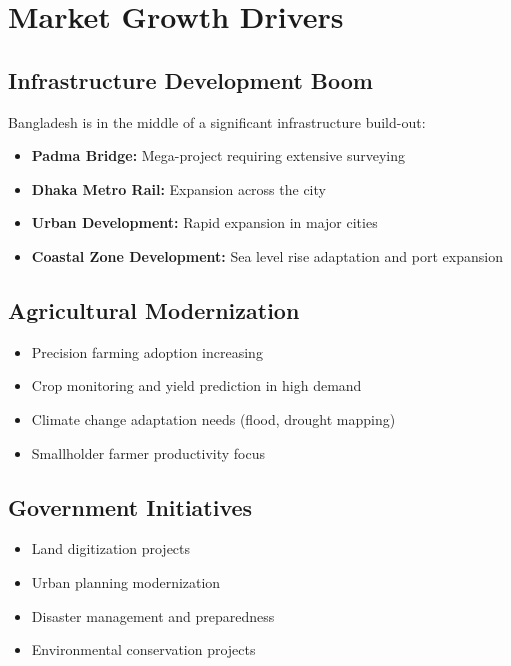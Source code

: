 \section{Market Growth Drivers}

\subsection{Infrastructure Development Boom}

Bangladesh is in the middle of a significant infrastructure build-out:

\begin{itemize}
    \item \textbf{Padma Bridge:} Mega-project requiring extensive surveying
    \item \textbf{Dhaka Metro Rail:} Expansion across the city
    \item \textbf{Urban Development:} Rapid expansion in major cities
    \item \textbf{Coastal Zone Development:} Sea level rise adaptation and port expansion
\end{itemize}

\subsection{Agricultural Modernization}

\begin{itemize}
    \item Precision farming adoption increasing
    \item Crop monitoring and yield prediction in high demand
    \item Climate change adaptation needs (flood, drought mapping)
    \item Smallholder farmer productivity focus
\end{itemize}

\subsection{Government Initiatives}

\begin{itemize}
    \item Land digitization projects
    \item Urban planning modernization
    \item Disaster management and preparedness
    \item Environmental conservation projects
\end{itemize}

